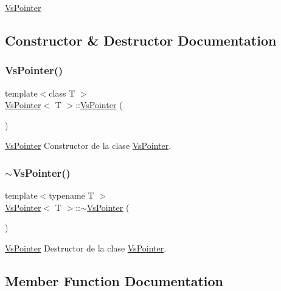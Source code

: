 \hyperlink{class_vs_pointer}{Vs\+Pointer} 

\subsection{Constructor \& Destructor Documentation}
\mbox{\label{class_vs_pointer_ad2066426995a68e2fde8c62c55cc2396}} 
\subsubsection{\texorpdfstring{Vs\+Pointer()}{VsPointer()}}
{\footnotesize\ttfamily template$<$class T $>$ \\
\hyperlink{class_vs_pointer}{Vs\+Pointer}$<$ T $>$\+::\hyperlink{class_vs_pointer}{Vs\+Pointer} (\begin{DoxyParamCaption}{ }\end{DoxyParamCaption})}



\hyperlink{class_vs_pointer}{Vs\+Pointer} Constructor de la clase \hyperlink{class_vs_pointer}{Vs\+Pointer}. 

\mbox{\label{class_vs_pointer_a10c30d26192226abb265366456986eb4}} 
\subsubsection{\texorpdfstring{$\sim$\+Vs\+Pointer()}{~VsPointer()}}
{\footnotesize\ttfamily template$<$typename T $>$ \\
\hyperlink{class_vs_pointer}{Vs\+Pointer}$<$ T $>$\+::$\sim$\hyperlink{class_vs_pointer}{Vs\+Pointer} (\begin{DoxyParamCaption}{ }\end{DoxyParamCaption})}



\hyperlink{class_vs_pointer}{Vs\+Pointer} Destructor de la clase \hyperlink{class_vs_pointer}{Vs\+Pointer}. 



\subsection{Member Function Documentation}
\mbox{\label{class_vs_pointer_a98bcbff767bf90817c4122639cffb227}} 
